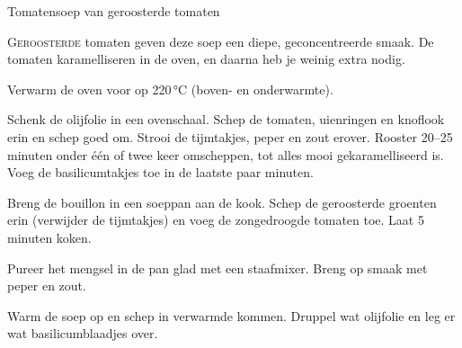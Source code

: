 \begin{recipe}{Tomatensoep van geroosterde tomaten}


\lettrine{G}{eroosterde} tomaten geven deze soep een diepe, geconcentreerde smaak.
De tomaten karamelliseren in de oven, en daarna heb je weinig extra nodig.

\begin{ingredients}
\end{ingredients}

\begin{steps}
  \item Verwarm de oven voor op 220\,°C (boven- en onderwarmte).
  \item Schenk de olijfolie in een ovenschaal. Schep de tomaten, uienringen en
        knoflook erin en schep goed om. Strooi de tijmtakjes, peper en zout erover.
        Rooster 20--25 minuten
        onder één of twee keer omscheppen, tot alles mooi gekaramelliseerd is. Voeg de
        basilicumtakjes toe in de laatste paar minuten.
  \item Breng de bouillon in een soeppan aan de kook. Schep de geroosterde groenten erin
        (verwijder de tijmtakjes) en voeg de zongedroogde tomaten toe. Laat 5 minuten
        koken.
  \item Pureer het mengsel in de pan glad met een staafmixer. Breng op smaak met peper en zout.
  \item Warm de soep op en schep in verwarmde kommen. Druppel wat olijfolie en leg er wat basilicumblaadjes over.
\end{steps}
\end{recipe}
